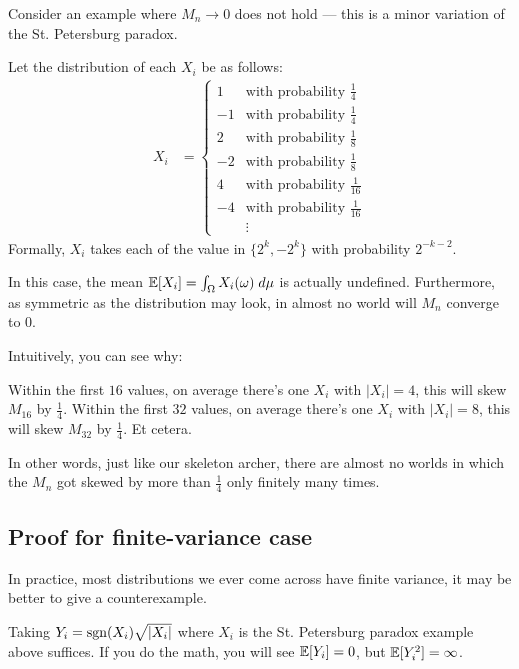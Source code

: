 \begin{example}[The hypothesis {$\EE[X_i]=0$} is important]
	Consider an example where $M_n \to 0$ does not hold ---
	this is a minor variation of the St. Petersburg paradox.

	Let the distribution of each $X_i$ be as follows:
	\begin{align*}
		X_i &= \begin{cases}
			1&\text{with probability }\frac{1}{4} \\
			-1&\text{with probability }\frac{1}{4} \\
			2&\text{with probability }\frac{1}{8} \\
			-2&\text{with probability }\frac{1}{8} \\
			4&\text{with probability }\frac{1}{16} \\
			-4&\text{with probability }\frac{1}{16} \\
			&\vdots
		\end{cases}
	\end{align*}
	Formally, $X_i$ takes each of the value in $\{2^k,-2^k\}$ with probability $2^{-k-2}$.

	In this case, the mean $\mathbb E[X_i] = \int_\Omega X_i(\omega) \; d\mu$ is actually undefined.
	Furthermore, as symmetric as the distribution may look, in almost no world will $M_n$ converge
	to $0$.

	Intuitively, you can see why:
	\begin{itemize}
		\ii Within the first $16$ values, on average there's one $X_i$ with $|X_i|=4$,
		this will skew $M_{16}$ by $\frac{1}{4}$.
		\ii Within the first $32$ values, on average there's one $X_i$ with $|X_i|=8$,
		this will skew $M_{32}$ by $\frac{1}{4}$.
		\ii Et cetera.
	\end{itemize}
	In other words, just like our skeleton archer, there are almost no worlds in which the $M_n$
	got skewed by more than $\frac{1}{4}$ only finitely many times.
\end{example}

\subsection{Proof for finite-variance case}

In practice, most distributions we ever come across have finite variance,
it may be better to give a counterexample.

\begin{example}
	Taking $Y_i = \operatorname{sgn}(X_i) \sqrt{|X_i|}$ where $X_i$ is the St. Petersburg paradox example
	above suffices. If you do the math, you will see $\mathbb E[Y_i] = 0$, but $\mathbb E[Y_i^2] = \infty$.
\end{example}

